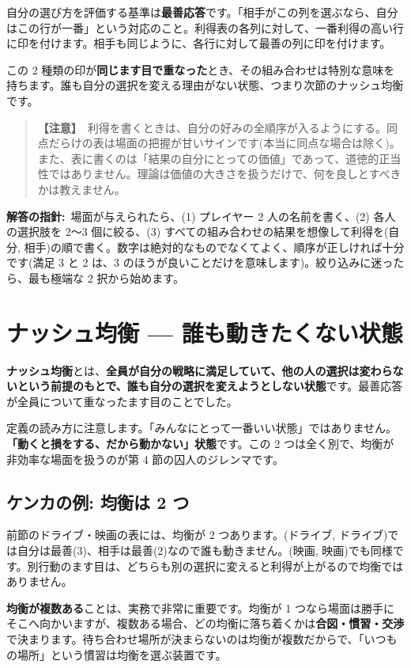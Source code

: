 \documentclass{article}
\begin{document}
自分の選び方を評価する基準は\textbf{最善応答}です。「相手がこの列を選ぶなら、自分はこの行が一番」という対応のこと。利得表の各列に対して、一番利得の高い行に印を付けます。相手も同じように、各行に対して最善の列に印を付けます。

この 2 種類の印が\textbf{同じます目で重なった}とき、その組み合わせは特別な意味を持ちます。誰も自分の選択を変える理由がない状態、つまり次節のナッシュ均衡です。

\begin{quote}
\textbf{【注意】}\ 利得を書くときは、自分の好みの全順序が入るようにする。同点だらけの表は場面の把握が甘いサインです(本当に同点な場合は除く)。また、表に書くのは「結果の自分にとっての価値」であって、道徳的正当性ではありません。理論は価値の大きさを扱うだけで、何を良しとすべきかは教えません。
\end{quote}

\textbf{解答の指針:}\ 場面が与えられたら、(1) プレイヤー 2 人の名前を書く、(2) 各人の選択肢を 2〜3 個に絞る、(3) すべての組み合わせの結果を想像して利得を(自分, 相手)の順で書く。数字は絶対的なものでなくてよく、順序が正しければ十分です(満足 3 と 2 は、3 のほうが良いことだけを意味します)。絞り込みに迷ったら、最も極端な 2 択から始めます。

\section{ナッシュ均衡 — 誰も動きたくない状態}

\textbf{ナッシュ均衡}とは、\textbf{全員が自分の戦略に満足していて、他の人の選択は変わらないという前提のもとで、誰も自分の選択を変えようとしない状態}です。最善応答が全員について重なったます目のことでした。

定義の読み方に注意します。「みんなにとって一番いい状態」ではありません。\textbf{「動くと損をする、だから動かない」状態}です。この 2 つは全く別で、均衡が非効率な場面を扱うのが第 4 節の囚人のジレンマです。

\subsection{ケンカの例: 均衡は 2 つ}

前節のドライブ・映画の表には、均衡が 2 つあります。(ドライブ, ドライブ)では自分は最善(3)、相手は最善(2)なので誰も動きません。(映画, 映画)でも同様です。別行動のます目は、どちらも別の選択に変えると利得が上がるので均衡ではありません。

\textbf{均衡が複数ある}ことは、実務で非常に重要です。均衡が 1 つなら場面は勝手にそこへ向かいますが、複数ある場合、どの均衡に落ち着くかは\textbf{合図・慣習・交渉}で決まります。待ち合わせ場所が決まらないのは均衡が複数だからで、「いつもの場所」という慣習は均衡を選ぶ装置です。
\end{document}
